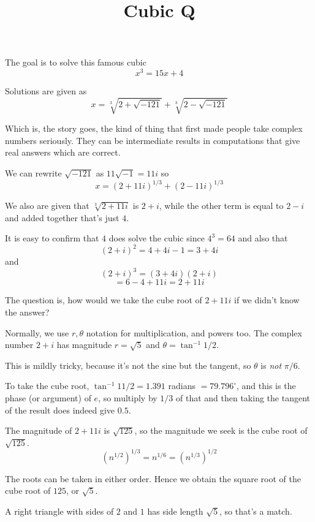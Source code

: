 \documentclass[11pt, oneside]{article}
\title{Cubic Q}
\date{}
\begin{document}
\maketitle
\Large

The goal is to solve this famous cubic
\[ x^3 = 15x + 4 \]

Solutions are given as
\[ x = \sqrt[3]{2 + \sqrt{-121}} + \sqrt[3]{2 - \sqrt{-121}} \]

Which is, the story goes, the kind of thing that first made people take complex numbers seriously.  They can be intermediate results in computations that give real answers which are correct.

We can rewrite $\sqrt{-121}$ as $11 \sqrt{-1} = 11i$ so
\[ x = (2 + 11i)^{1/3} + (2 - 11i)^{1/3} \]

We also are given that $\sqrt[3]{2 + 11i}$ is $2 + i$, while the other term is equal to $2 - i$ and added together that's just $4$.

It is easy to confirm that $4$ does solve the cubic since $4^3 = 64$ and also that
\[ (2 + i)^2 = 4 + 4i - 1 = 3 + 4i \]
and
\[ (2 + i)^3 = (3 + 4i)(2 + i) \]
\[ = 6 - 4 + 11i = 2 + 11i \]

The question is, how would we take the cube root of $2 + 11i$ if we didn't know the answer?  

Normally, we use $r, \theta$ notation for multiplication, and powers too.  The complex number $2 + i$ has magnitude $r = \sqrt{5}$ and $\theta = \tan^{-1} 1/2$.  

This is mildly tricky, because it's not the sine but the tangent, so $\theta$ is \emph{not} $\pi/6$.

To take the cube root, $\tan^{-1} 11/2 = 1.391$ radians $ = 79.796^{\circ}$, and this is the phase (or argument) of $e$, so multiply by $1/3$ of that and then taking the tangent of the result does indeed give $0.5$.  

The magnitude of $2 + 11i$ is $\sqrt{125}$, so the magnitude we seek is the cube root of $\sqrt{125}$.  
\[ (n^{1/2})^{1/3} = n^{1/6} = (n^{1/3})^{1/2} \]

The roots can be taken in either order.  Hence we obtain the square root of the cube root of $125$, or $\sqrt{5}$.

A right triangle with sides of $2$ and $1$ has side length $\sqrt{5}$, so that's a match.
\end{document}
